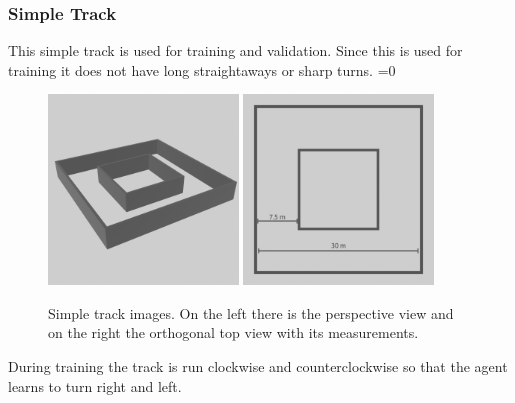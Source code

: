 \documentclass[14pt]{extarticle}
\newcounter{debug}
\begin{document}
\begin{flushleft}
	\subsubsection{Simple Track}
	This simple track is used for training and validation. Since this is used for training it does not have long straightaways or sharp turns.
	\ifnum\value{debug}=0 {
	\begin{figure}[H]
    		\centering\includegraphics[width=0.45\textwidth]{./Image/Environment/Easy/perspective.png}
    		\centering\includegraphics[width=0.45\textwidth]{./Image/Environment/Easy/top_mod.png}
		\vspace{5mm}
		\caption{Simple track images. On the left there is the perspective view and on the right the orthogonal top view with its measurements.}
	\end{figure}
	}\fi
	During training the track is run clockwise and counterclockwise so that the agent learns to turn right and left.
	

\end{flushleft}
\end{document}
